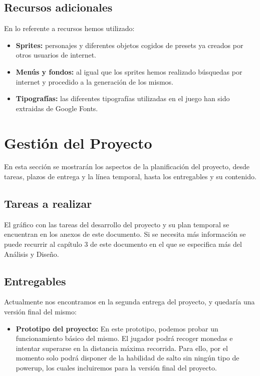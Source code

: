 \documentclass[palatino]{apuntes}
\begin{document}
\begin{itemize}
\section{Recursos adicionales}
En lo referente a recursos hemos utilizado:

\begin{itemize}
	\item \textbf{Sprites:} personajes y diferentes objetos  cogidos de presets ya creados por otros usuarios de internet.
	\item \textbf{Menús y fondos:} al igual que los sprites hemos realizado búsquedas por internet y procedido a la generación de los mismos.
	
	\item \textbf{Tipografías:} las diferentes tipografías utilizadas en el juego han sido extraidas de Google Fonts.
\end{itemize}




\chapter{Gestión del Proyecto}
En esta sección se mostrarán los aspectos de la planificación del proyecto, desde tareas, plazos de entrega y la línea temporal, hasta los entregables y su contenido.

\section{Tareas a realizar}
El gráfico con las tareas del desarrollo del proyecto y su plan temporal se encuentran en los anexos de este documento. Si se necesita más información se puede recurrir al capítulo 3 de este documento en el que se especifica más del Análisis y Diseño.

\section{Entregables}

Actualmente nos encontramos en la segunda entrega del proyecto, y quedaría una versión final del mismo:

\begin{itemize}

	\item \textbf{Prototipo del proyecto:} En este prototipo, podemos probar un funcionamiento básico del mismo. El jugador podrá recoger monedas e intentar superarse en la distancia máxima recorrida. Para ello, por el momento solo podrá disponer de la habilidad de salto sin ningún tipo de powerup, los cuales incluiremos para la versión final del proyecto.


\end{itemize}
\end{itemize}
\end{document}
